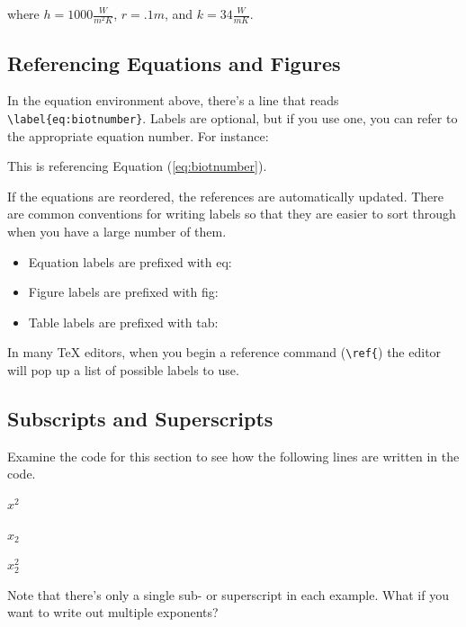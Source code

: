 \documentclass[12pt,a4paper]{article}
\begin{document}
  where $h = 1000 \frac{W}{m^2K}$, $r = .1m$, and $k = 34 \frac{W}{m
  K}$.
  
  \subsection{Referencing Equations and Figures}
  In the equation environment above, there's a line that reads
  \verb|\label{eq:biotnumber}|.  Labels are optional, but if you use
  one, you can refer to the appropriate equation number.  For instance:
  
  \vspace{.5cm} %

  This is referencing Equation (\ref{eq:biotnumber}).
  
  \vspace{.5cm} %

  If the equations are reordered, the references are automatically
  updated.  There are common conventions for writing labels so that they
  are easier to sort through when you have a large number of them.  

  \begin{itemize}
    \item Equation labels are prefixed with eq:
    \item Figure labels are prefixed with fig:
    \item Table labels are prefixed with tab:
  \end{itemize}

  In many TeX editors, when you begin a reference command (\verb|\ref{|)
  the editor will pop up a list of possible labels to use.

  \subsection{Subscripts and Superscripts}
  Examine the code for this section to see how the following lines are
  written in the code.

  \begin{center}

  $x^2$

  $x_2$

  $x^2_2$

  \end{center}
  
  Note that there's only a single sub- or superscript in each example.
  What if you want to write out multiple exponents?
\end{document}
